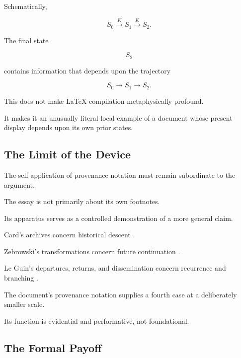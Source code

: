 \documentclass[
  11pt,
  a4paper,
  DIV=12,
  BCOR=0mm,
  parskip=half-
]{scrartcl}
\theoremstyle{definition}
\theoremstyle{plain}
\theoremstyle{remark}
\begin{document}
Schematically,

\[
  S_0
  \xrightarrow{K}
  S_1
  \xrightarrow{K}
  S_2.
\]

The final state

\[
  S_2
\]

contains information that depends upon the trajectory

\[
  S_0\to S_1\to S_2.
\]

This does not make LaTeX compilation metaphysically profound.

It makes it an unusually literal local example of a document whose present
display depends upon its own prior states.


\subsection{The Limit of the Device}
\label{app:self-application-limit}

The self-application of provenance notation must remain subordinate to the
argument.

The essay is not primarily about its own footnotes.

Its apparatus serves as a controlled demonstration of a more general claim.

Card's archives concern historical descent \cite{card1989}.

Zebrowski's transformations concern future continuation
\cite{zebrowski1979}.

Le Guin's departures, returns, and dissemination concern recurrence and
branching \cite{leguin1974}.

The document's provenance notation supplies a fourth case at a deliberately
smaller scale.

Its function is evidential and performative, not foundational.


\subsection{The Formal Payoff}
\label{app:wound-theorem}
\end{document}
